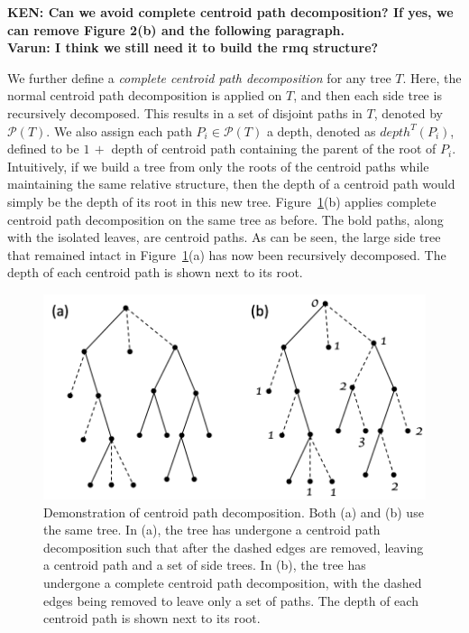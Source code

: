 \documentclass[final,1p,times]{elsarticle}
\begin{document}
    {\bf KEN: Can we avoid complete centroid path decomposition? If yes, we can remove Figure 2(b) and the following paragraph.}\\
	{\bf Varun: I think we still need it to build the rmq structure?}

    We further define a \textit{complete centroid path decomposition} for any tree $T$. Here, the normal centroid path decomposition is applied on $T$, and then each side tree is recursively decomposed. This results in a set of disjoint paths in $T$, denoted by $\mathcal{P}(T)$. We also assign each path $P_i \in \mathcal{P}(T)$ a depth, denoted as $depth^{T}(P_i)$, defined to be $1\, +$ depth of centroid path containing the parent of the root of $P_i$. Intuitively, if we build a tree from only the roots of the centroid paths while maintaining the same relative structure, then the depth of a centroid path would simply be the depth of its root in this new tree. Figure~\ref{fig:centroid}(b) applies complete centroid path decomposition on the same tree as before. The bold paths, along with the isolated leaves, are centroid paths. As can be seen, the large side tree that remained intact in Figure~\ref{fig:centroid}(a) has now been recursively decomposed. The depth of each centroid path is shown next to its root.

    \begin{figure}[ht]
        \includegraphics[scale=0.5]{centroid}
        \centering
        \caption[Centroid path decomposition]{Demonstration of centroid path decomposition. Both (a) and (b) use the same tree. In (a), the tree has undergone a centroid path decomposition such that after the dashed edges are removed, leaving a centroid path and a set of side trees. In (b), the tree has undergone a complete centroid path decomposition, with the dashed edges being removed to leave only a set of paths. The depth of each centroid path is shown next to its root.}
        \label{fig:centroid}
    \end{figure}
\end{document}
